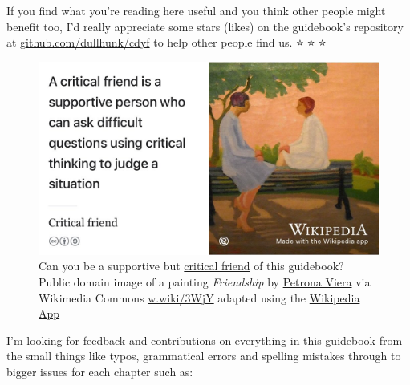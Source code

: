 \documentclass[
]{book}
\begin{document}
If you find what you're reading here useful and you think other people might benefit too, I'd really appreciate some stars (likes) on the guidebook's repository at \href{https://github.com/dullhunk/cdyf}{github.com/dullhunk/cdyf} to help other people find us. ⭐️🤩⭐️🤩⭐️

\begin{figure}

{\centering \includegraphics[width=1\linewidth]{images/critical-friend} 

}

\caption{Can you be a supportive but \href{https://en.wikipedia.org/wiki/Critical_friend}{critical friend} of this guidebook? Public domain image of a painting \emph{Friendship} by \href{https://en.wikipedia.org/wiki/Petrona_Viera}{Petrona Viera} via Wikimedia Commons \href{https://w.wiki/3WjY}{w.wiki/3WjY} adapted using the \href{https://apps.apple.com/us/app/wikipedia/id324715238}{Wikipedia App}}\label{fig:critical-friend-fig}
\end{figure}



I'm looking for feedback and contributions on everything in this guidebook from the small things like typos, grammatical errors and spelling mistakes through to bigger issues for each chapter such as:
\end{document}
